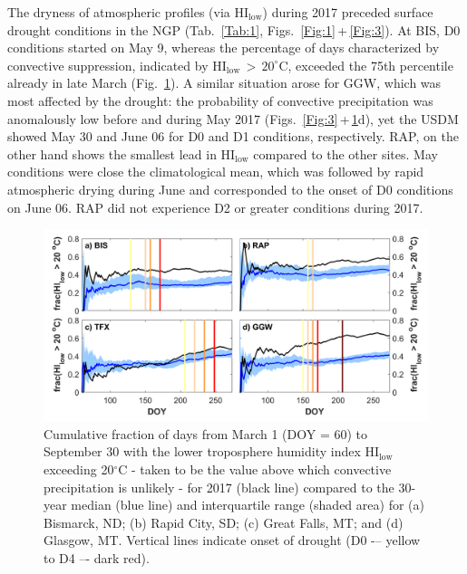 \documentclass[hess, manuscript]{copernicus}
\begin{document}
The dryness of atmospheric profiles (via $\mathrm{HI_{low}}$) during 2017 preceded surface drought conditions in the NGP (Tab.~\ref{Tab:1}, Figs.~\ref{Fig:1}\,+\,\ref{Fig:3}). At BIS, D0 conditions started on May 9, whereas the percentage of days characterized by convective suppression, indicated by $\mathrm{HI_{low}\,>\,20^\circ}$C, exceeded the 75th percentile already in late March (Fig.~\ref{Fig:4}). A similar situation arose for GGW, which was most affected by the drought: the probability of convective precipitation was anomalously low before and during May 2017 (Figs.~\ref{Fig:3}\,+\,\ref{Fig:4}d), yet the USDM showed May 30 and June 06 for D0 and D1 conditions, respectively. RAP, on the other hand shows the smallest lead in $\mathrm{HI_{low}}$ compared to the other sites. May conditions were close the climatological mean, which was followed by rapid atmospheric drying during June and corresponded to the onset of D0 conditions on June 06. RAP did not experience D2 or greater conditions during 2017.
%
\begin{figure}[t]
\includegraphics[width=12cm]{./Figures/HIlowC_IQR.png}
\caption{Cumulative fraction of days from March 1 (DOY = 60) to September 30 with the lower troposphere humidity index $\mathrm{HI_{low}}$ exceeding 20$\mathrm{^\circ}$C - taken to be the value above which convective precipitation is unlikely - for 2017 (black line) compared to the 30-year median (blue line) and interquartile range (shaded area) for (a) Bismarck, ND; (b) Rapid City, SD; (c) Great Falls, MT; and (d) Glasgow, MT. Vertical lines indicate onset of drought (D0 -– yellow to D4 –- dark red). }\label{Fig:4}
\end{figure}
\end{document}
